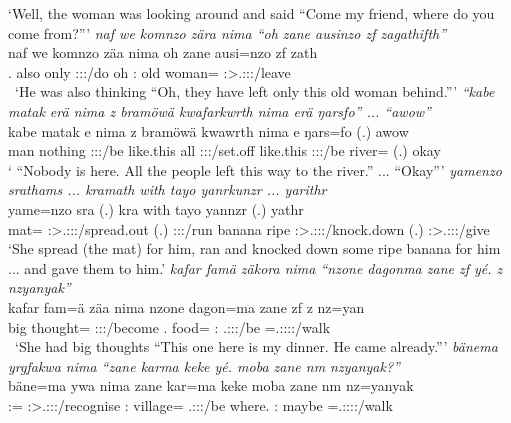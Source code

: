 \begin{exe}
	\trans `Well, the woman was looking around and said ``Come my friend, where do you come from?'''
	\emph{naf we komnzo zära nima ``oh zane ausinzo zf zagathifth''}\\
	\gll naf we komnzo zäa nima oh zane ausi=nzo zf zath\\
	\Tsg.{\Erg} also only \Stsg:\Sbj:\Pst:\Pfv/do {\Quot} oh \Dem:{\Prox} {old woman}={\Only} {\Imm} \Stpl:\Sbj>\Tsg.\F:\Obj:\Rpst:\Pfv/leave\\\
	\trans `He was also thinking ``Oh, they have left only this old woman behind.'''
\exi{36}
	\emph{``kabe matak erä nima z bramöwä kwafarkwrth nima erä ŋarsfo'' ... ``awow''}\\
	\gll kabe matak e nima z bramöwä kwa\stem{fark}wrth nima e\stem{rä} ŋars=fo (.) awow\\
	man nothing \Stpl:\Sbj:\Nonpast:\Ipfv/be {like.this} {\Iam} all \Stpl:\Sbj:\Pst:\Ipfv/set.off {like.this} \Stpl:\Sbj:\Nonpast:\Ipfv/be river={\All} (.) okay\\
	\trans ` ``Nobody is here. All the people left this way to the river.'' ... ``Okay'''
\exi{37}
	\emph{yamenzo srathams ... kramath with tayo yanrkunzr ... yarithr}\\
	\gll yame=nzo sra\stem{thams} (.) kra\stem{math} with tayo yannzr (.) yathr\\
	mat={\Only} \Stsg:\Sbj>\Tsg.\Masc:\Io:\Irr:\Pfv/spread.out (.) \Stsg:\Sbj:\Irr:\Pfv/run banana ripe \Stsg:\Sbj>\Tsg.\Masc:\Io:\Nonpast:\Ipfv/knock.down (.) \Stsg:\Sbj>\Tsg.\Masc:\Io:\Nonpast:\Ipfv/give\\
	\trans `She spread (the mat) for him, ran and knocked down some ripe banana for him ... and gave them to him.'
\exi{38}
	\emph{kafar famä zäkora nima ``nzone dagonma zane zf yé. z nzyanyak''}\\
	\gll kafar fam=ä zä\stem{kor}a nima nzone dagon=ma zane zf \stem{yé} z nz=yan\\
	big thought={\Assoc} \Stsg:\Sbj:\Pst:\Pfv/become {\Quot} \Fsg.{\Poss} food={\Char} \Dem:{\Prox} {\Imm} \Tsg.\Masc:\Sbj:\Nonpast:\Ipfv/be {\Iam} \Immpst=\Tsg.\Masc:\Sbj:\Nonpast:\Ipfv:\Venit/walk\\\
	\trans `She had big thoughts ``This one here is my dinner. He came already.'''
\exi{39}
	\emph{bänema yrgfakwa nima ``zane karma keke yé. moba zane nm nzyanyak?''}\\
	\gll bäne=ma ywa nima zane kar=ma keke  moba zane nm nz=yanyak\\
	\Dem:\Med={\Char} \Stsg:\Sbj>\Tsg.\Masc:\Obj:\Pst:\Ipfv/recognise {\Quot} \Dem:{\Prox} village={\Char} {\Neg} \Tsg.\Masc:\Sbj:\Nonpast:\Ipfv/be where.{\Abl} \Dem:{\Prox} maybe  \Immpst=\Tsg.\Masc:\Sbj:\Nonpast:\Ipfv:\Venit/walk\\

\end{exe}
